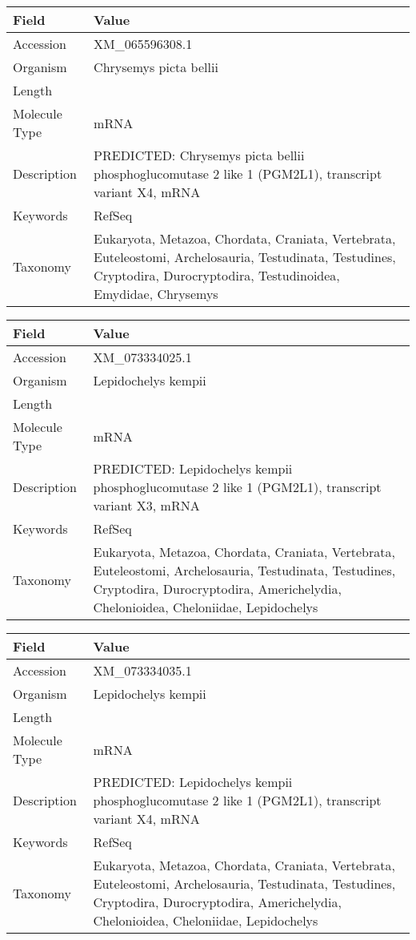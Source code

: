 \documentclass[10pt]{article}
\begin{document}
\vspace{1em}
{\footnotesize
\begin{longtable}{>{\raggedright\arraybackslash}p{4.5cm} >{\raggedright\arraybackslash}p{11.5cm}}
\textbf{Field} & \textbf{Value} \\
\hline
Accession & XM\_065596308.1 \\
Organism & Chrysemys picta bellii \\
Length & 7894 \\
Molecule Type & mRNA \\
Description & PREDICTED: Chrysemys picta bellii phosphoglucomutase 2 like 1 (PGM2L1), transcript variant X4, mRNA \\
Keywords & RefSeq \\
Taxonomy & Eukaryota, Metazoa, Chordata, Craniata, Vertebrata, Euteleostomi, Archelosauria, Testudinata, Testudines, Cryptodira, Durocryptodira, Testudinoidea, Emydidae, Chrysemys \\
\end{longtable}
}

\vspace{1em}
{\footnotesize
\begin{longtable}{>{\raggedright\arraybackslash}p{4.5cm} >{\raggedright\arraybackslash}p{11.5cm}}
\textbf{Field} & \textbf{Value} \\
\hline
Accession & XM\_073334025.1 \\
Organism & Lepidochelys kempii \\
Length & 7902 \\
Molecule Type & mRNA \\
Description & PREDICTED: Lepidochelys kempii phosphoglucomutase 2 like 1 (PGM2L1), transcript variant X3, mRNA \\
Keywords & RefSeq \\
Taxonomy & Eukaryota, Metazoa, Chordata, Craniata, Vertebrata, Euteleostomi, Archelosauria, Testudinata, Testudines, Cryptodira, Durocryptodira, Americhelydia, Chelonioidea, Cheloniidae, Lepidochelys \\
\end{longtable}
}

\vspace{1em}
{\footnotesize
\begin{longtable}{>{\raggedright\arraybackslash}p{4.5cm} >{\raggedright\arraybackslash}p{11.5cm}}
\textbf{Field} & \textbf{Value} \\
\hline
Accession & XM\_073334035.1 \\
Organism & Lepidochelys kempii \\
Length & 1958 \\
Molecule Type & mRNA \\
Description & PREDICTED: Lepidochelys kempii phosphoglucomutase 2 like 1 (PGM2L1), transcript variant X4, mRNA \\
Keywords & RefSeq \\
Taxonomy & Eukaryota, Metazoa, Chordata, Craniata, Vertebrata, Euteleostomi, Archelosauria, Testudinata, Testudines, Cryptodira, Durocryptodira, Americhelydia, Chelonioidea, Cheloniidae, Lepidochelys \\
\end{longtable}
}
\end{document}
